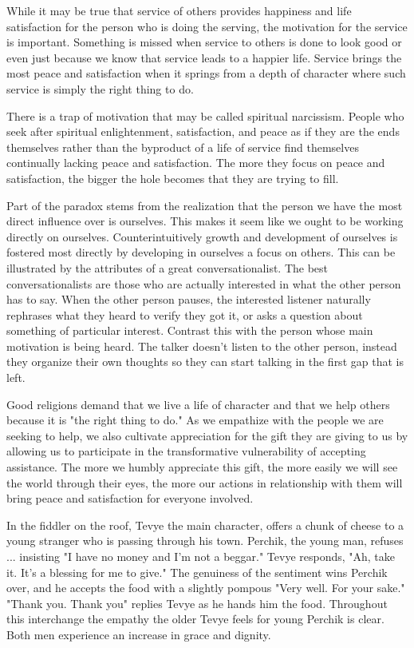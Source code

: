 \documentclass[ebook,12pt,openany,twoside]{memoir}
\begin{document}
\noindent While it may be true that service of others provides happiness and life
satisfaction for the person who is doing the serving, the motivation for the
service is important. Something is missed when service to others is done to look good or even just
because we know that service leads to a happier life. Service brings the most peace and satisfaction when it springs from a depth of character where such service is simply the
right thing to do.

There is a trap of motivation that may be called spiritual narcissism. People
who seek after spiritual enlightenment, satisfaction, and peace as if they are
the ends themselves rather than the byproduct of a life of service find
themselves continually lacking peace and satisfaction. The more they focus on
peace and satisfaction, the bigger the hole becomes that they are trying to
fill.

Part of the paradox stems from the realization that the person we have the most
direct influence over is ourselves. This makes it seem like we ought to be
working directly on ourselves. Counterintuitively growth and development of ourselves is fostered
most directly by developing in ourselves a focus on others. This can be illustrated by
the attributes of a great conversationalist. The best conversationalists are
those who are actually interested in what the other person has to say. When the
other person pauses, the interested listener naturally rephrases what they
heard to verify they got it, or asks a question about something of particular
interest. Contrast this with the person whose main motivation is being heard.
The talker doesn't listen to the other person, instead they organize their own
thoughts so they can start talking in the first gap that is left.

Good religions demand that we live a life of character and
that we help others because it is "the right thing to do." As we empathize with the people we are seeking to help, we also cultivate appreciation for the gift they are giving to us by allowing us to participate in the transformative vulnerability of accepting assistance.  The more we humbly appreciate this gift, the more easily we will see the world through their
eyes, the more our actions in relationship with them will bring peace and satisfaction for everyone involved.

In the fiddler on the roof, Tevye the main character, offers a chunk of cheese to a young stranger who is passing through his town.  Perchik, the young man, refuses ... insisting "I have no money and I'm not a beggar."  Tevye responds, "Ah, take it. It's a blessing for me to give."  The genuiness of the sentiment wins Perchik over, and he accepts the food with a slightly pompous "Very well.  For your sake."  "Thank you. Thank you" replies Tevye as he hands him the food.  Throughout this interchange the empathy the older Tevye feels for young Perchik is clear.  Both men experience an increase in grace and dignity.
\end{document}
